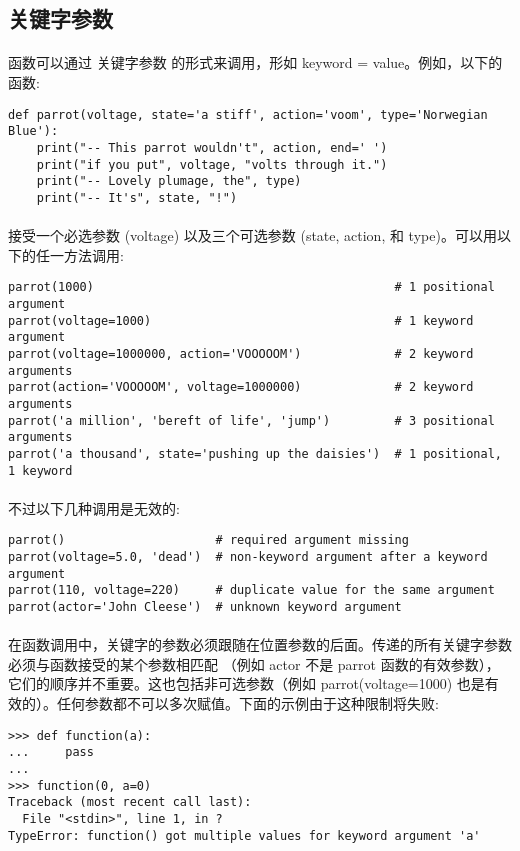 \documentclass{article}
\begin{document}
\begin{CJK}{UTF8}{gbsn}
\section{关键字参数}
\paragraph{}
函数可以通过 关键字参数 的形式来调用，形如 keyword = value。例如，以下的函数:
\begin{verbatim}
def parrot(voltage, state='a stiff', action='voom', type='Norwegian Blue'):
    print("-- This parrot wouldn't", action, end=' ')
    print("if you put", voltage, "volts through it.")
    print("-- Lovely plumage, the", type)
    print("-- It's", state, "!")
\end{verbatim}
\paragraph{}
接受一个必选参数 (voltage) 以及三个可选参数 (state, action, 和 type)。可以用以下的任一方法调用:
\begin{verbatim}
parrot(1000)                                          # 1 positional argument
parrot(voltage=1000)                                  # 1 keyword argument
parrot(voltage=1000000, action='VOOOOOM')             # 2 keyword arguments
parrot(action='VOOOOOM', voltage=1000000)             # 2 keyword arguments
parrot('a million', 'bereft of life', 'jump')         # 3 positional arguments
parrot('a thousand', state='pushing up the daisies')  # 1 positional, 1 keyword
\end{verbatim}
\paragraph{}
不过以下几种调用是无效的:
\begin{verbatim}
parrot()                     # required argument missing
parrot(voltage=5.0, 'dead')  # non-keyword argument after a keyword argument
parrot(110, voltage=220)     # duplicate value for the same argument
parrot(actor='John Cleese')  # unknown keyword argument
\end{verbatim}
\paragraph{}
在函数调用中，关键字的参数必须跟随在位置参数的后面。传递的所有关键字参数必须与函数接受的某个参数相匹配 （例如 actor 不是 parrot 函数的有效参数），它们的顺序并不重要。这也包括非可选参数（例如 parrot(voltage=1000) 也是有效的）。任何参数都不可以多次赋值。下面的示例由于这种限制将失败:
\begin{verbatim}
>>> def function(a):
...     pass
...
>>> function(0, a=0)
Traceback (most recent call last):
  File "<stdin>", line 1, in ?
TypeError: function() got multiple values for keyword argument 'a'
\end{verbatim}

\end{CJK}
\end{document}
